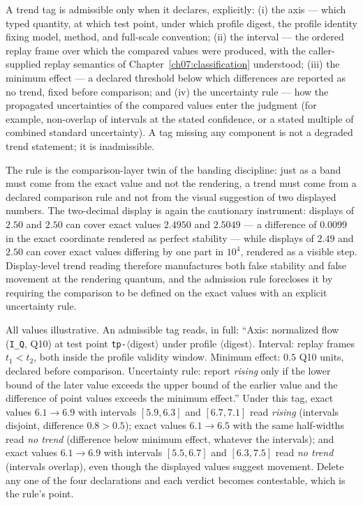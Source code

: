 \begin{ruleenv}\label{ch08:rule:trend}
A trend tag is admissible only when it declares, explicitly: (i) the axis
--- which typed quantity, at which test point, under which profile digest,
the profile identity fixing model, method, and full-scale convention;
(ii) the interval --- the ordered replay frame over which the compared
values were produced, with the caller-supplied replay semantics of
Chapter~\ref{ch07:classification} understood; (iii) the minimum effect ---
a declared threshold below which differences are reported as no trend,
fixed before comparison; and (iv) the uncertainty rule --- how the
propagated uncertainties of the compared values enter the judgment (for
example, non-overlap of intervals at the stated confidence, or a stated
multiple of combined standard uncertainty). A tag missing any component is
not a degraded trend statement; it is inadmissible.
\end{ruleenv}

The rule is the comparison-layer twin of the banding discipline: just as a
band must come from the exact value and not the rendering, a trend must
come from a declared comparison rule and not from the visual suggestion of
two displayed numbers. The two-decimal display is again the cautionary
instrument: displays of $2.50$ and $2.50$ can cover exact values $2.4950$
and $2.5049$ --- a difference of $0.0099$ in the exact coordinate rendered
as perfect stability --- while displays of $2.49$ and $2.50$ can cover
exact values differing by one part in $10^4$, rendered as a visible step.
Display-level trend reading therefore manufactures both false stability
and false movement at the rendering quantum, and the admission rule
forecloses it by requiring the comparison to be defined on the exact
values with an explicit uncertainty rule.

\begin{example}\label{ch08:ex:trend}
All values illustrative. An admissible tag reads, in full: ``Axis:
normalized flow (\texttt{I\_Q}, Q10) at test point
\texttt{tp-}$\langle$digest$\rangle$ under profile
$\langle$digest$\rangle$. Interval: replay frames $t_1 < t_2$, both
inside the profile validity window. Minimum effect: $0.5$ Q10 units,
declared before comparison. Uncertainty rule: report \emph{rising} only
if the lower bound of the later value exceeds the upper bound of the
earlier value and the difference of point values exceeds the minimum
effect.'' Under this tag, exact values $6.1 \to 6.9$ with intervals
$[5.9, 6.3]$ and $[6.7, 7.1]$ read \emph{rising} (intervals disjoint,
difference $0.8 > 0.5$); exact values $6.1 \to 6.5$ with the same
half-widths read \emph{no trend} (difference below minimum effect,
whatever the intervals); and exact values $6.1 \to 6.9$ with intervals
$[5.5, 6.7]$ and $[6.3, 7.5]$ read \emph{no trend} (intervals overlap),
even though the displayed values suggest movement. Delete any one of
the four declarations and each verdict becomes contestable, which is
the rule's point.
\end{example}

